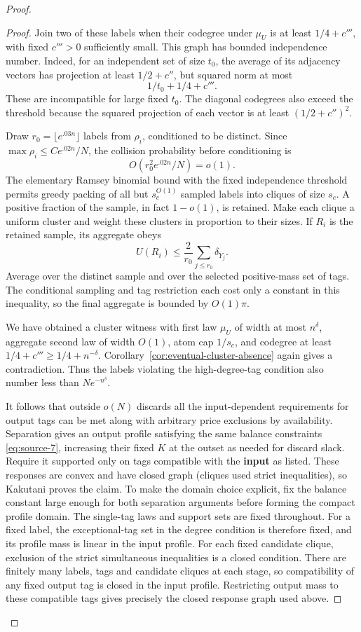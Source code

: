 \begin{proof}
\begin{proof}
Join two of these labels when their codegree under \(\mu_U\) is at least \(1/4+c'''\), with fixed \(c'''>0\) sufficiently small. This graph has bounded independence number. Indeed, for an independent set of size \(t_0\), the average of its adjacency vectors has projection at least \(1/2+c''\), but squared norm at most
\[
 1/t_0+1/4+c'''.
\]
These are incompatible for large fixed \(t_0\). The diagonal codegrees also exceed the threshold because the squared projection of each vector is at least \((1/2+c'')^2\).

Draw \(r_0=\lfloor e^{.03n}\rfloor\) labels from \(\rho_i\), conditioned to be distinct. Since \(\max\rho_i\le C e^{.02n}/N\), the collision probability before conditioning is
\[
 O(r_0^2e^{.02n}/N)=o(1).
\]
The elementary Ramsey binomial bound with the fixed independence threshold permits greedy packing of all but \(s_c^{O(1)}\) sampled labels into cliques of size \(s_c\). A positive fraction of the sample, in fact \(1-o(1)\), is retained. Make each clique a uniform cluster and weight these clusters in proportion to their sizes. If \(R_i\) is the retained sample, its aggregate obeys
\[
 U(R_i)\le\frac2{r_0}\sum_{j\le r_0}\delta_{Y_j}.
\]
Average over the distinct sample and over the selected positive-mass set of tags. The conditional sampling and tag restriction each cost only a constant in this inequality, so the final aggregate is bounded by \(O(1)\pi\).

We have obtained a cluster witness with first law \(\mu_U\) of width at most \(n^\delta\), aggregate second law of width \(O(1)\), atom cap \(1/s_c\), and codegree at least \(1/4+c'''\ge1/4+n^{-\delta}\). Corollary~\ref{cor:eventual-cluster-absence} again gives a contradiction. Thus the labels violating the high-degree-tag condition also number less than \(Ne^{-n^\delta}\).

It follows that outside \(o(N)\) discards all the input-dependent requirements for output tags can be met along with arbitrary price exclusions by availability. Separation gives an output profile satisfying the same balance constraints \eqref{eq:source-7}, increasing their fixed \(K\) at the outset as needed for discard slack. Require it supported only on tags compatible with the \textbf{input} as listed. These responses are convex and have closed graph (cliques used strict inequalities), so Kakutani proves the claim. To make the domain choice explicit, fix the balance constant large enough for both separation arguments before forming the compact profile domain. The single-tag laws and support sets are fixed throughout. For a fixed label, the exceptional-tag set in the degree condition is therefore fixed, and its profile mass is linear in the input profile. For each fixed candidate clique, exclusion of the strict simultaneous inequalities is a closed condition. There are finitely many labels, tags and candidate cliques at each stage, so compatibility of any fixed output tag is closed in the input profile. Restricting output mass to these compatible tags gives precisely the closed response graph used above.
\end{proof}


\end{proof}
